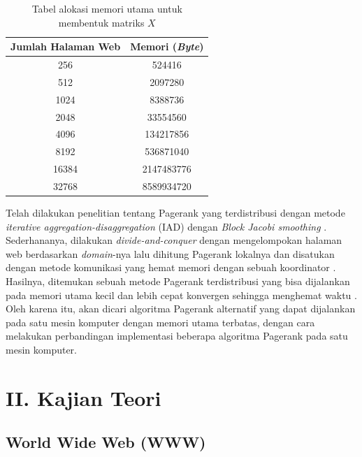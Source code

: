 \documentclass[
	a4paper, %
	12pt, %
	unnumberedsections, %
	twoside, %
]{LTJournalArticle}
\begin{document}
\begin{table}
	\centering
	\caption{Tabel alokasi memori utama untuk membentuk matriks $X$}
	\label{table:1}
	\begin{tabular}{|c|c|} 
		\hline
		Jumlah Halaman Web & Memori (\textit{Byte}) \\
		\hline
		
		\hline
		256 & 524416 \\
		512 & 2097280 \\
		1024 & 8388736 \\
		2048 & 33554560 \\
		4096 & 134217856 \\
		8192 & 536871040 \\
		16384 & 2147483776 \\
		32768 & 8589934720 \\
		\hline
	\end{tabular}
\end{table}

Telah dilakukan penelitian tentang Pagerank yang terdistribusi dengan metode \textit{iterative aggregation-disaggregation} (IAD) dengan \textit{Block Jacobi smoothing} \citep{zhuetal2005distributedPagerank}. Sederhananya, dilakukan \textit{divide-and-conquer} dengan mengelompokan halaman web berdasarkan \textit{domain}-nya lalu dihitung Pagerank lokalnya dan disatukan dengan metode komunikasi yang hemat memori dengan sebuah koordinator \citep{zhuetal2005distributedPagerank}. Hasilnya, ditemukan sebuah metode Pagerank terdistribusi yang bisa dijalankan pada memori utama kecil dan lebih cepat konvergen sehingga menghemat waktu \citep{zhuetal2005distributedPagerank}. Oleh karena itu, akan dicari algoritma Pagerank alternatif yang dapat dijalankan pada satu mesin komputer dengan memori utama terbatas, dengan cara melakukan perbandingan implementasi beberapa algoritma Pagerank pada satu mesin komputer.


\section{II. Kajian Teori}

\subsection{World Wide Web (WWW)}
\end{document}
